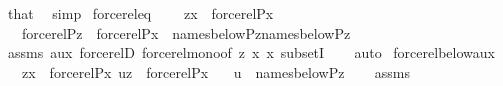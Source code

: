 \begin{isabellebody}
\ that\ \isamarkupfalse%
\ simp\isanewline
{}\isamarkupfalse%
%
\endisatagproof
{\isafoldproof}%
%
\isadelimproof
\isanewline
%
\endisadelimproof
\isanewline
{}\isamarkupfalse%
\ forcerel{\isacharunderscore}{\kern0pt}eq\ {\isacharcolon}{\kern0pt}\isanewline
\ \ \ {\isachardoublequoteopen}{\isasymlangle}z{\isacharcomma}{\kern0pt}x{\isasymrangle}\ {\isasymin}\ forcerel{\isacharparenleft}{\kern0pt}P{\isacharcomma}{\kern0pt}x{\isacharparenright}{\kern0pt}{\isachardoublequoteclose}\isanewline
\ \ \ {\isachardoublequoteopen}forcerel{\isacharparenleft}{\kern0pt}P{\isacharcomma}{\kern0pt}z{\isacharparenright}{\kern0pt}\ {\isacharequal}{\kern0pt}\ forcerel{\isacharparenleft}{\kern0pt}P{\isacharcomma}{\kern0pt}x{\isacharparenright}{\kern0pt}\ {\isasyminter}\ names{\isacharunderscore}{\kern0pt}below{\isacharparenleft}{\kern0pt}P{\isacharcomma}{\kern0pt}z{\isacharparenright}{\kern0pt}{\isasymtimes}names{\isacharunderscore}{\kern0pt}below{\isacharparenleft}{\kern0pt}P{\isacharcomma}{\kern0pt}z{\isacharparenright}{\kern0pt}{\isachardoublequoteclose}\isanewline
%
\isadelimproof
\ \ %
\endisadelimproof
%
\isatagproof
{}\isamarkupfalse%
\ assms\ aux\ forcerelD\ forcerel{\isacharunderscore}{\kern0pt}mono{\isacharbrackleft}{\kern0pt}of\ z\ x\ x{\isacharbrackright}{\kern0pt}\ subsetI\isanewline
\ \ \isamarkupfalse%
\ auto%
\endisatagproof
{\isafoldproof}%
%
\isadelimproof
\isanewline
%
\endisadelimproof
\isanewline
{}\isamarkupfalse%
\ forcerel{\isacharunderscore}{\kern0pt}below{\isacharunderscore}{\kern0pt}aux\ {\isacharcolon}{\kern0pt}\isanewline
\ \ \ {\isachardoublequoteopen}{\isasymlangle}z{\isacharcomma}{\kern0pt}x{\isasymrangle}\ {\isasymin}\ forcerel{\isacharparenleft}{\kern0pt}P{\isacharcomma}{\kern0pt}x{\isacharparenright}{\kern0pt}{\isachardoublequoteclose}\ {\isachardoublequoteopen}{\isasymlangle}u{\isacharcomma}{\kern0pt}z{\isasymrangle}\ {\isasymin}\ forcerel{\isacharparenleft}{\kern0pt}P{\isacharcomma}{\kern0pt}x{\isacharparenright}{\kern0pt}{\isachardoublequoteclose}\isanewline
\ \ \ {\isachardoublequoteopen}u\ {\isasymin}\ names{\isacharunderscore}{\kern0pt}below{\isacharparenleft}{\kern0pt}P{\isacharcomma}{\kern0pt}z{\isacharparenright}{\kern0pt}{\isachardoublequoteclose}\isanewline
%
\isadelimproof
\ \ %
\endisadelimproof
%
\isatagproof
{}\isamarkupfalse%
\ assms{\isacharparenleft}{\kern0pt}{}{\isacharparenright}{\kern0pt}\isanewline
\ \ \isamarkupfalse%

\end{isabellebody}
